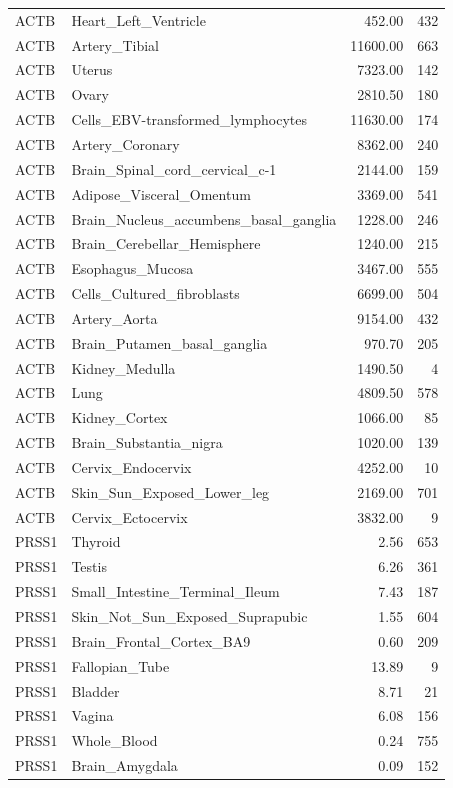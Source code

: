 \begin{footnotesize}
\begin{longtable}{llrr}
ACTB & Heart\_Left\_Ventricle & 452.00 & 432 \\
ACTB & Artery\_Tibial & 11600.00 & 663 \\
ACTB & Uterus & 7323.00 & 142 \\
ACTB & Ovary & 2810.50 & 180 \\
ACTB & Cells\_EBV-transformed\_lymphocytes & 11630.00 & 174 \\
ACTB & Artery\_Coronary & 8362.00 & 240 \\
ACTB & Brain\_Spinal\_cord\_cervical\_c-1 & 2144.00 & 159 \\
ACTB & Adipose\_Visceral\_Omentum & 3369.00 & 541 \\
ACTB & Brain\_Nucleus\_accumbens\_basal\_ganglia & 1228.00 & 246 \\
ACTB & Brain\_Cerebellar\_Hemisphere & 1240.00 & 215 \\
ACTB & Esophagus\_Mucosa & 3467.00 & 555 \\
ACTB & Cells\_Cultured\_fibroblasts & 6699.00 & 504 \\
ACTB & Artery\_Aorta & 9154.00 & 432 \\
ACTB & Brain\_Putamen\_basal\_ganglia & 970.70 & 205 \\
ACTB & Kidney\_Medulla & 1490.50 & 4 \\
ACTB & Lung & 4809.50 & 578 \\
ACTB & Kidney\_Cortex & 1066.00 & 85 \\
ACTB & Brain\_Substantia\_nigra & 1020.00 & 139 \\
ACTB & Cervix\_Endocervix & 4252.00 & 10 \\
ACTB & Skin\_Sun\_Exposed\_Lower\_leg & 2169.00 & 701 \\
ACTB & Cervix\_Ectocervix & 3832.00 & 9 \\
PRSS1 & Thyroid & 2.56 & 653 \\
PRSS1 & Testis & 6.26 & 361 \\
PRSS1 & Small\_Intestine\_Terminal\_Ileum & 7.43 & 187 \\
PRSS1 & Skin\_Not\_Sun\_Exposed\_Suprapubic & 1.55 & 604 \\
PRSS1 & Brain\_Frontal\_Cortex\_BA9 & 0.60 & 209 \\
PRSS1 & Fallopian\_Tube & 13.89 & 9 \\
PRSS1 & Bladder & 8.71 & 21 \\
PRSS1 & Vagina & 6.08 & 156 \\
PRSS1 & Whole\_Blood & 0.24 & 755 \\
PRSS1 & Brain\_Amygdala & 0.09 & 152 \\

\end{longtable}
\end{footnotesize}
